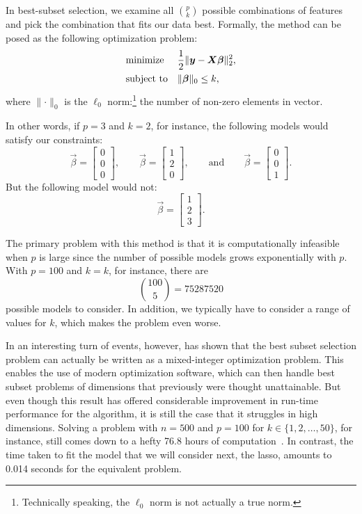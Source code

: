 In best-subset selection, we examine all \(\binom{p}{k}\) possible combinations of features and pick the combination that fits our data best. Formally, the method can be posed as the following optimization problem:
\[
  \begin{aligned}
     & \text{minimize}   &  & \frac{1}{2} \lVert \boldsymbol{y} - \boldsymbol{X}\boldsymbol{\beta}\rVert^2_2, \\
     & \text{subject to} &  & \lVert \boldsymbol{\beta} \rVert_0 \leq k,
  \end{aligned}
\]
where \(\lVert \cdot \rVert_0\) is the \(\ell_0\) norm:\footnote{Technically speaking, the \(\ell_0\) norm is not actually a true norm.} the number of non-zero elements in vector.

In other words, if \(p = 3\) and \(k = 2\), for instance, the following models would satisfy our constraints:
\[
  \vec{\beta} = \begin{bmatrix}0 \\ 0 \\ 0\end{bmatrix},\qquad \vec{\beta} = \begin{bmatrix}1 \\ 2 \\ 0\end{bmatrix},\qquad \text{and} \qquad \vec{\beta} = \begin{bmatrix}0 \\ 0 \\ 1\end{bmatrix}.
\]
But the following model would not:
\[
  \vec{\beta} = \begin{bmatrix}1 \\ 2 \\ 3\end{bmatrix}.
\]

The primary problem with this method is that it is computationally infeasible when \(p\) is large since the number of possible models grows exponentially with \(p\). With \(p = 100\) and \(k = k\), for instance, there are
\[
  \binom{100}{5} = \num{75287520}
\]
possible models to consider. In addition, we typically have to consider a range of values for \(k\), which makes the problem even worse.

In an interesting turn of events, however, \textcite{bertsimas2016} has shown that the best subset selection problem can actually be written as a mixed-integer optimization problem. This enables the use of modern optimization software, which can then handle best subset problems of dimensions that previously were thought unattainable. But even though this result has offered considerable improvement in run-time performance for the algorithm, it is still the case that it struggles in high dimensions. Solving a problem with \(n=500\) and \(p=100\) for \(k \in \{1,2,\dots,50\}\), for instance, still comes down to a hefty 76.8 hours of computation~\parencite{hastie2020}. In contrast, the time taken to fit the model that we will consider next, the lasso, amounts to 0.014 seconds for the equivalent problem.

